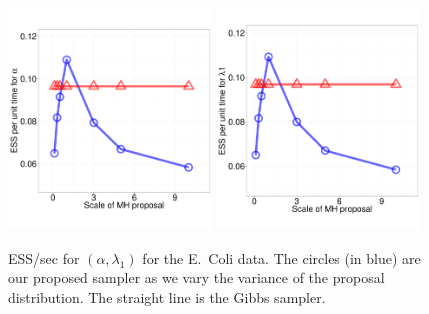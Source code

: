   \begin{figure}[H]
  \centering
  \begin{minipage}[!hp]{.68\linewidth}
    \includegraphics [width=0.48\textwidth, angle=0]{figs/ECOLI_alpha.pdf}
    \includegraphics [width=0.48\textwidth, angle=0]{figs/ECOLI_l1.pdf}
  \end{minipage}  
  \begin{minipage}[!hp]{.01\linewidth}
  \end{minipage}
  \begin{minipage}[!hp]{.3\linewidth}
    \caption{ESS/sec for $(\alpha,\lambda_1)$ for the E.\ Coli data. The circles (in blue) are our 
      proposed sampler as we vary the variance of the proposal distribution. 
      The straight line is the Gibbs sampler. }
     \label{fig:ECOLI}
  \end{minipage}  

  \end{figure}


